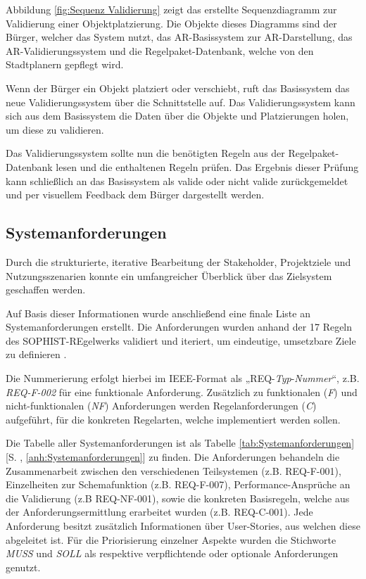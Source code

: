 Abbildung \ref{fig:Sequenz Validierung} zeigt das erstellte Sequenzdiagramm zur Validierung einer Objektplatzierung. Die Objekte dieses Diagramms sind der Bürger, welcher das System nutzt, das AR-Basissystem zur AR-Darstellung, das AR-Validierungssystem und die Regelpaket-Datenbank, welche von den Stadtplanern gepflegt wird.

Wenn der Bürger ein Objekt platziert oder verschiebt, ruft das Basissystem das neue Validierungssystem über die Schnittstelle  auf. Das Validierungssystem kann sich aus dem Basissystem die Daten über die Objekte und Platzierungen holen, um diese zu validieren.

Das Validierungssystem sollte nun die benötigten Regeln aus der Regelpaket-Datenbank lesen und die enthaltenen Regeln prüfen. Das Ergebnis dieser Prüfung kann schließlich an das Basissystem als valide oder nicht valide zurückgemeldet und per visuellem Feedback dem Bürger dargestellt werden.

\subsection{Systemanforderungen}\label{subsection:Systemanforderungen}

Durch die strukturierte, iterative Bearbeitung der Stakeholder, Projektziele und Nutzungsszenarien konnte ein umfangreicher Überblick über das Zielsystem geschaffen werden.

Auf Basis dieser Informationen wurde anschließend eine finale Liste an Systemanforderungen erstellt. Die Anforderungen wurden anhand der 17 Regeln des SOPHIST-REgelwerks validiert und iteriert, um eindeutige, umsetzbare Ziele zu definieren \parencite[S. 174-191]{ruppRequirementsEngineeringUndManagement2021}.

Die Nummerierung erfolgt hierbei im IEEE-Format als „REQ-\textit{Typ}-\textit{Nummer}“, z.B. \textit{REQ-F-002} für eine funktionale Anforderung. Zusätzlich zu funktionalen (\textit{F}) und nicht-funktionalen (\textit{NF}) Anforderungen werden Regelanforderungen (\textit{C}) aufgeführt, für die konkreten Regelarten, welche implementiert werden sollen.

\medskip

Die Tabelle aller Systemanforderungen ist als Tabelle \ref{tab:Systemanforderungen} [S. \pageref{tab:Systemanforderungen}, \ref{anh:Systemanforderungen}] zu finden. Die Anforderungen behandeln die Zusammenarbeit zwischen den verschiedenen Teilsystemen (z.B. REQ-F-001), Einzelheiten zur Schemafunktion (z.B. REQ-F-007), Performance-Ansprüche an die Validierung (z.B REQ-NF-001), sowie die konkreten Basisregeln, welche aus der Anforderungsermittlung erarbeitet wurden (z.B. REQ-C-001). Jede Anforderung besitzt zusätzlich Informationen über User-Stories, aus welchen diese abgeleitet ist. Für die Priorisierung einzelner Aspekte wurden die Stichworte \textit{MUSS} und \textit{SOLL} als respektive verpflichtende oder optionale Anforderungen genutzt.

